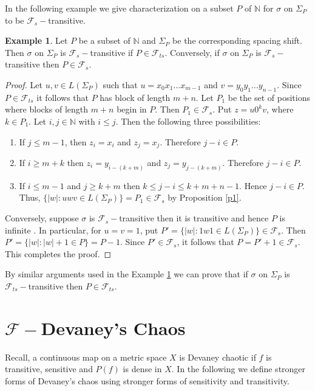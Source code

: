 \documentclass{amsart}[12pt, papera4]
\theoremstyle{definition}
\newtheorem{example}[theorem]{Example}
\theoremstyle{remark}
\numberwithin{equation}{section}
\def\N{{\mathbb N}}
\def\F{{\mathscr{F}}}
\begin{document}
\noindent In the following example we give characterization on a subset $P$ of $\N$ for $\sigma$ on $\Sigma_P$ to be $\F_s-$transitive.


\begin{example}\label{eg1} Let $P$ be a subset of $\N$ and $\Sigma_P$ be the corresponding spacing shift. Then $\sigma$ on $\Sigma_P$ is $\F_s-$transitive if $P\in \F_{ts}$. Conversely, if $\sigma$ on $\Sigma_P$ is $\F_s-$transitive then $P\in \F_s$.
\end{example}

\begin{proof}
	Let $u,v\in L(\Sigma_P)$ such that $u=x_0x_1\dots x_{m-1}$ and $v=y_0y_1\dots y_{n-1}$. Since $P\in \F_{ts}$ it follows that $P$ has block of length $m+n$. Let $P_1$ be the set of positions where blocks of length $m+n$ begin in $P$. Then $P_1\in \F_s$. Put $z=u0^kv$, where $k\in P_1$. Let $i,j\in \N$ with $i\leq j$. Then the following three possibilities: 
	\begin{enumerate}
		\item If $j\leq m-1$,  then $z_i=x_i$ and $z_j=x_j$. Therefore $j-i\in P$. 
		\item If $i\geq m+k$ then $z_i=y_{i-(k+m)}$ and $z_j=y_{j-(k+m)}$. Therefore $j-i\in P$. 
		\item If $i\leq m-1$ and $j\geq k+m$ then $k\leq j-i\leq k+m+n-1$. Hence $j-i\in P$. Thus, $\{|w|:uwv\in L(\Sigma_P)\}=P_1\in \F_s$ by Proposition \ref{p1}. 
	\end{enumerate}			
	
	
	\noindent Conversely, suppose $\sigma$ is $\F_s-$transitive then it is transitive and hence $P$ is infinite \cite{Banks}. In particular, for $u=v=1$, put $P'=\{|w|:1w1\in L(\Sigma_P)\}\in \F_s$. Then $P'=\{|w|:|w|+1\in P\}=P-1$. Since $P'\in \F_s$, it follows that $P=P'+1\in \F_s$. This completes the proof.
\end{proof}


\noindent  By similar arguments used in the Example \ref{eg1} we can prove that if $\sigma$ on $\Sigma_P$ is $\F_{ts}-$transitive then $P\in \F_{ts}$.



\medskip
\section{$\mathscr{F}-$Devaney's Chaos}

\medskip
\noindent Recall, a continuous map on a metric space $X$ is Devaney chaotic if $f$ is transitive,  sensitive and $P(f)$ is dense in $X$. In the following we define stronger forms of Devaney's chaos using stronger forms of sensitivity and transitivity. 
\end{document}
